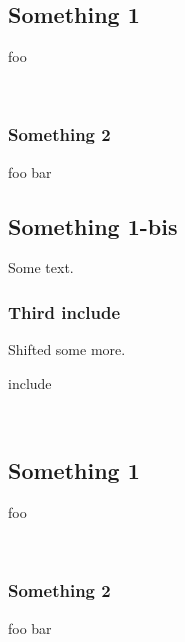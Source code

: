 \subsection{Something 1\label{something-1}}%
foo

\label{package-test+u+package+++ml-module-Include+u+sections-val-foo}\\
\subsubsection{Something 2\label{something-2}}%
\label{package-test+u+package+++ml-module-Include+u+sections-val-bar}\begin{ocamlindent}foo bar\end{ocamlindent}%
\medbreak
\subsection{Something 1-bis\label{something-1-bis}}%
Some text.

\subsubsection{Third include\label{third-include}}%
Shifted some more.

\begin{keyword}include\end{keyword}
 \hyperref[package-test+u+package+++ml-module-Include+u+sections-module-type-Something]{}\label{package-test+u+package+++ml-module-Include+u+sections-val-something}\\
\subsection{Something 1\label{something-1}}%
foo

\label{package-test+u+package+++ml-module-Include+u+sections-val-foo}\\
\subsubsection{Something 2\label{something-2}}%
\label{package-test+u+package+++ml-module-Include+u+sections-val-bar}\begin{ocamlindent}foo bar\end{ocamlindent}%
\medbreak
